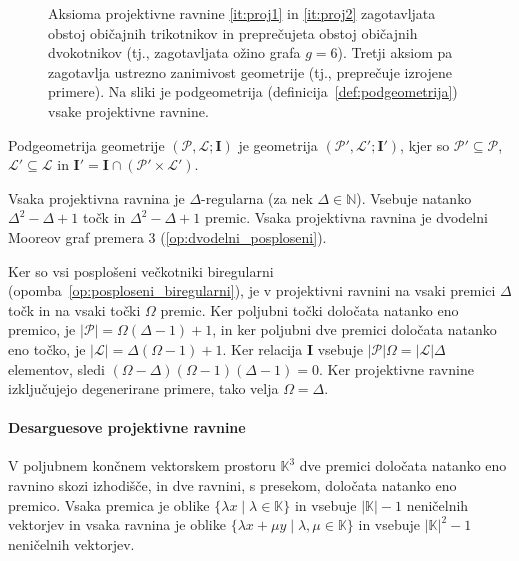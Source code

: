 \documentclass[fin1, tisk]{fmfdelo}
\newcommand{\II}{\mathbf{I}}
\newcommand{\PP}{\mathcal{P}}
\newcommand{\LL}{\mathcal{L}}
\begin{document}
\begin{figure}[ht]
    \centering
    \def\svgwidth{\columnwidth}
    \caption{Aksioma projektivne ravnine \ref{it:proj1} in \ref{it:proj2} zagotavljata obstoj običajnih trikotnikov
    in preprečujeta obstoj običajnih dvokotnikov (tj., zagotavljata ožino grafa $g=6$). Tretji aksiom pa zagotavlja ustrezno
    zanimivost geometrije (tj., preprečuje izrojene primere). Na sliki je podgeometrija (definicija~\ref{def:podgeometrija}) vsake projektivne ravnine.}
    \label{fig:proj_ravnina_aksiomi}
\end{figure}


\begin{definicija}\label{def:podgeometrija}
    Podgeometrija geometrije $(\PP, \LL; \II)$ je geometrija $(\PP', \LL'; \II')$,
    kjer so $\PP' \subseteq \PP$, $\LL' \subseteq \LL$ in $\II' = \II \cap (\PP' \times \LL')$.
\end{definicija}

\begin{opomba}
    Vsaka projektivna ravnina je $\Delta$-regularna (za nek $\Delta\in\mathbb{N}$). Vsebuje 
    natanko $\Delta^2 - \Delta + 1$ točk in $\Delta^2 - \Delta + 1$ premic.
    Vsaka projektivna ravnina je dvodelni Mooreov graf premera $3$ (\ref{op:dvodelni_posploseni}).
\end{opomba}
\begin{dokaz}
    Ker so vsi posplošeni večkotniki biregularni (opomba~\ref{op:posploseni_biregularni}), je v projektivni ravnini na vsaki premici 
    $\Delta$ točk in na vsaki točki $\Omega$ premic. Ker poljubni točki določata natanko eno premico,
    je $|\PP| = \Omega (\Delta - 1) + 1$, in ker poljubni dve premici določata natanko eno točko, je $|\LL| = \Delta (\Omega - 1) + 1$.
    Ker relacija $\II$ vsebuje $|\PP| \Omega = |\LL| \Delta$ elementov, sledi $(\Omega - \Delta)(\Omega-1)(\Delta-1) = 0$. Ker projektivne
    ravnine izključujejo degenerirane primere, tako velja $\Omega = \Delta$.
\end{dokaz}

\paragraph{Desarguesove projektivne ravnine}\label{par:desarguesove_ravnine}

V poljubnem končnem vektorskem prostoru $\mathbb{K}^{3}$ dve premici
določata natanko eno ravnino skozi izhodišče,
in dve ravnini, s presekom, določata natanko eno premico. 
Vsaka premica je oblike $\{\lambda x\mid \lambda\in\mathbb{K}\}$ 
in vsebuje $|\mathbb{K}|-1$ neničelnih vektorjev in vsaka ravnina
je oblike $\{\lambda x + \mu y\mid \lambda, \mu\in\mathbb{K}\}$ 
in vsebuje
$|\mathbb{K}|^2-1$ neničelnih vektorjev. 
\end{document}
